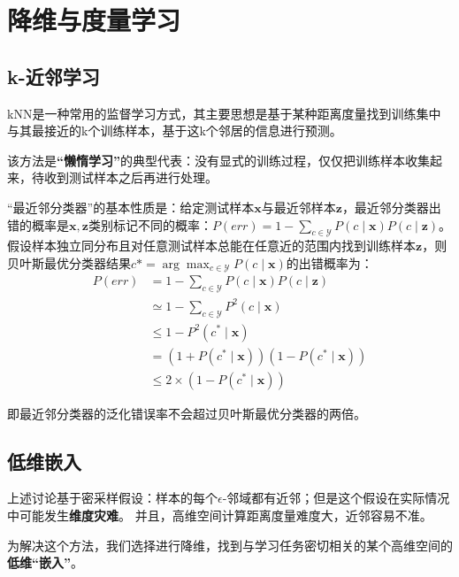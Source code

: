 \chapter{降维与度量学习}

\section{k-近邻学习}\label{sec:10.1}
kNN是一种常用的监督学习方式，其主要思想是基于某种距离度量找到训练集中与其最接近的k个训练样本，基于这k个邻居的信息进行预测。

该方法是\textbf{“懒惰学习”}的典型代表：没有显式的训练过程，仅仅把训练样本收集起来，待收到测试样本之后再进行处理。

“最近邻分类器”的基本性质是：给定测试样本$\boldsymbol x$与最近邻样本$\boldsymbol z$，最近邻分类器出错的概率是$\boldsymbol x,\boldsymbol z$类别标记不同的概率：$P(err) = 1-\sum_{c\in \mathcal{Y}}P(c\mid \boldsymbol x)P(c\mid \boldsymbol z)$。
假设样本独立同分布且对任意测试样本总能在任意近的范围内找到训练样本$\boldsymbol z$，则贝叶斯最优分类器结果$c* = \arg\max_{c\in \mathcal{Y}}P(c\mid \boldsymbol x)$的出错概率为：
\[
\begin{aligned} P(e r r) & =1-\sum_{c \in \mathcal{Y}} P(c \mid \boldsymbol{x}) P(c \mid \boldsymbol{z}) \\ & \simeq 1-\sum_{c \in \mathcal{Y}} P^{2}(c \mid \boldsymbol{x}) \\ & \leqslant 1-P^{2}\left(c^{*} \mid \boldsymbol{x}\right) \\ & =\left(1+P\left(c^{*} \mid \boldsymbol{x}\right)\right)\left(1-P\left(c^{*} \mid \boldsymbol{x}\right)\right) \\ & \leqslant 2 \times\left(1-P\left(c^{*} \mid \boldsymbol{x}\right)\right)\end{aligned}
\]

即最近邻分类器的泛化错误率不会超过贝叶斯最优分类器的两倍。

\section{低维嵌入}\label{sec:10.2}

上述讨论基于密采样假设：样本的每个$\epsilon$-邻域都有近邻；但是这个假设在实际情况中可能发生\textbf{维度灾难}。
并且，高维空间计算距离度量难度大，近邻容易不准。

为解决这个方法，我们选择进行降维，找到与学习任务密切相关的某个高维空间的\textbf{低维“嵌入”}。

